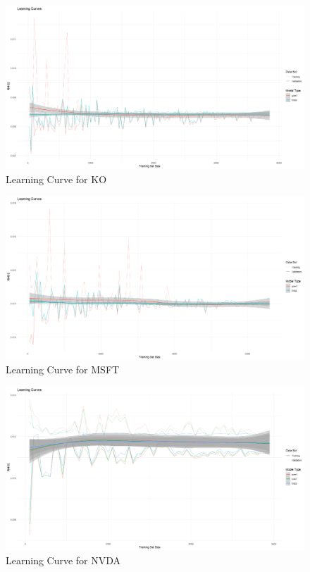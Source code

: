 \documentclass{article}
\begin{document}
\begin{figure}[h]
    \centering
    \includegraphics[width=0.9\linewidth]{visuals/Learning_curves_ko.png}
    \caption{Learning Curve for KO}
\end{figure}

\begin{figure}[h]
    \centering
    \includegraphics[width=0.9\linewidth]{visuals/Learning_curves_msft.png}
    \caption{Learning Curve for MSFT}
\end{figure}

\begin{figure}[h]
    \centering
    \includegraphics[width=0.9\linewidth]{visuals/Learning_curves_nvda.png}
    \caption{Learning Curve for NVDA}
\end{figure}
\end{document}
